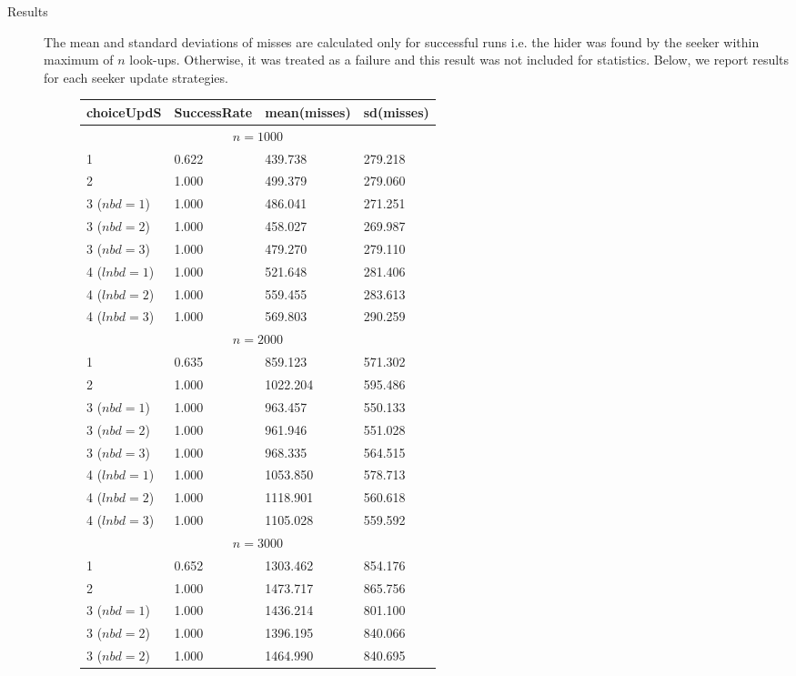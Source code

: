 \documentclass[11pt,a4paper]{article}
\begin{document}
\begin{description}
	\item[Results] The mean and standard deviations of misses are calculated only for successful runs i.e. the hider was found by the seeker within maximum of $n$ look-ups. Otherwise, it was treated as a failure and this result was not included for statistics. Below, we report results for each seeker update strategies.
	\begin{figure}[!h]
	\centering
	\begin{tabular}{llll}
		\hline \hline 
		choiceUpdS & SuccessRate & mean(misses) & sd(misses) \\
		\hline \hline 
		\multicolumn{4}{c}{$n = 1000$} \\ 
		\hline 
		1 &  0.622 & 439.738 & 279.218 \\
		2 &  1.000 & 499.379 & 279.060 \\
		3 ($nbd=1$) & 1.000 & 486.041 & 271.251 \\
		3 ($nbd=2$) & 1.000 & 458.027 & 269.987 \\
		3 ($nbd=3$) & 1.000 & 479.270 & 279.110 \\
		4 ($lnbd=1$) & 1.000 & 521.648 & 281.406 \\
		4 ($lnbd=2$) & 1.000 & 559.455 & 283.613 \\
		4 ($lnbd=3$) & 1.000 & 569.803 & 290.259 \\
		\hline 
		\hline 
		\multicolumn{4}{c}{$n = 2000$} \\ 
		\hline 
		1 &  0.635 & 859.123 & 571.302 \\
		2 &  1.000 & 1022.204 & 595.486 \\
		3 ($nbd=1$) & 1.000 & 963.457 & 550.133 \\
		3 ($nbd=2$) & 1.000 & 961.946 & 551.028 \\
		3 ($nbd=3$) & 1.000 & 968.335 & 564.515 \\
		4 ($lnbd=1$) & 1.000 & 1053.850 & 578.713 \\
		4 ($lnbd=2$) & 1.000 & 1118.901 & 560.618 \\
		4 ($lnbd=3$) & 1.000 & 1105.028 & 559.592 \\
		\hline 
		\hline 
		\multicolumn{4}{c}{$n = 3000$} \\ 
		\hline 
		1 &  0.652 & 1303.462 & 854.176 \\
		2 &  1.000 & 1473.717 & 865.756 \\
		3 ($nbd=1$) & 1.000 & 1436.214 & 801.100 \\
		3 ($nbd=2$) & 1.000 & 1396.195 & 840.066 \\
		3 ($nbd=2$) & 1.000 & 1464.990 & 840.695 \\

\end{tabular}
\end{figure}
\end{description}
\end{document}
